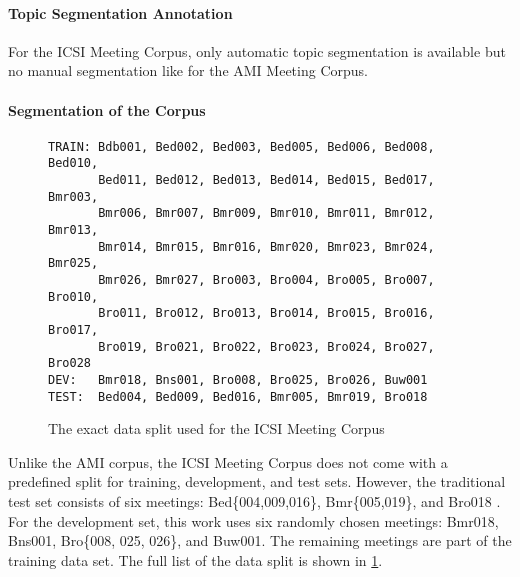 \paragraph{Topic Segmentation Annotation}

For the ICSI Meeting Corpus, only automatic topic segmentation is available but no manual segmentation like for the AMI Meeting Corpus.

\paragraph{Segmentation of the Corpus}

\begin{figure}[h]
\begin{lstlisting}[numbers=none]
TRAIN: Bdb001, Bed002, Bed003, Bed005, Bed006, Bed008, Bed010,
       Bed011, Bed012, Bed013, Bed014, Bed015, Bed017, Bmr003,
       Bmr006, Bmr007, Bmr009, Bmr010, Bmr011, Bmr012, Bmr013,
       Bmr014, Bmr015, Bmr016, Bmr020, Bmr023, Bmr024, Bmr025, 
       Bmr026, Bmr027, Bro003, Bro004, Bro005, Bro007, Bro010,
       Bro011, Bro012, Bro013, Bro014, Bro015, Bro016, Bro017,
       Bro019, Bro021, Bro022, Bro023, Bro024, Bro027, Bro028
DEV:   Bmr018, Bns001, Bro008, Bro025, Bro026, Buw001
TEST:  Bed004, Bed009, Bed016, Bmr005, Bmr019, Bro018
\end{lstlisting}
\caption{The exact data split used for the ICSI Meeting Corpus}
\label{fig:icsi-split}
\end{figure}

Unlike the AMI corpus, the ICSI Meeting Corpus does not come with a predefined split for training, development, and test sets.
However, the traditional test set consists of six meetings: Bed\{004,009,016\}, Bmr\{005,019\}, and Bro018 \cite{inproceedings}.
For the development set, this work uses six randomly chosen meetings: Bmr018, Bns001, Bro\{008, 025, 026\}, and Buw001.
The remaining meetings are part of the training data set.
The full list of the data split is shown in \cref{fig:icsi-split}.

